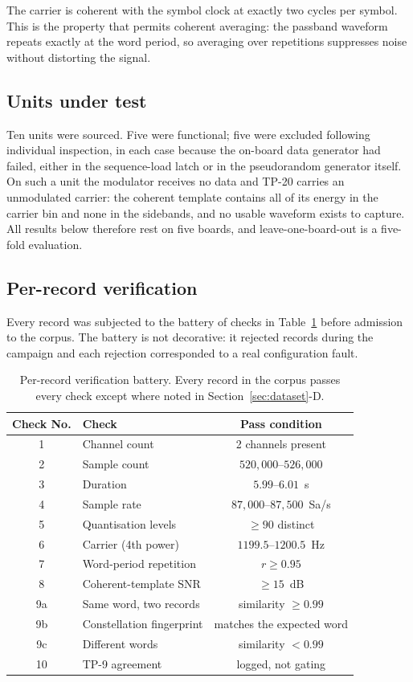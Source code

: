 \documentclass{ieeeaccess}
\begin{document}
The carrier is coherent with the symbol clock at exactly two cycles per symbol.
This is the property that permits coherent averaging: the passband waveform
repeats exactly at the word period, so averaging over repetitions suppresses
noise without distorting the signal.

\subsection{Units under test}
Ten units were sourced. Five were functional; five were excluded following
individual inspection, in each case because the on-board data generator had
failed, either in the sequence-load latch or in the pseudorandom generator
itself. On such a unit the modulator receives no data and TP-20 carries an
unmodulated carrier: the coherent template contains all of its energy in the
carrier bin and none in the sidebands, and no usable waveform exists to capture.
All results below therefore rest on five boards, and leave-one-board-out is a
five-fold evaluation.

\subsection{Per-record verification}
Every record was subjected to the battery of checks in Table~\ref{tab:checks}
before admission to the corpus. The battery is not decorative: it rejected
records during the campaign and each rejection corresponded to a real
configuration fault.

\begin{table}[!t]
\caption{Per-record verification battery. Every record in the corpus passes
every check except where noted in Section~\ref{sec:dataset}-D.}
\label{tab:checks}
\centering
\small
\begin{tabular}{clc}
\toprule
Check No. & Check & Pass condition \\
\midrule
1  & Channel count            & 2 channels present \\
2  & Sample count             & $520{,}000$--$526{,}000$ \\
3  & Duration                 & $5.99$--$6.01$~s \\
4  & Sample rate              & $87{,}000$--$87{,}500$~Sa/s \\
5  & Quantisation levels      & $\geq 90$ distinct \\
6  & Carrier (4th power)      & $1199.5$--$1200.5$~Hz \\
7  & Word-period repetition   & $r \geq 0.95$ \\
8  & Coherent-template SNR    & $\geq 15$~dB \\
9a & Same word, two records   & similarity $\geq 0.99$ \\
9b & Constellation fingerprint & matches the expected word \\
9c & Different words          & similarity $< 0.99$ \\
10 & TP-9 agreement           & logged, not gating \\
\bottomrule
\end{tabular}
\end{table}
\end{document}
